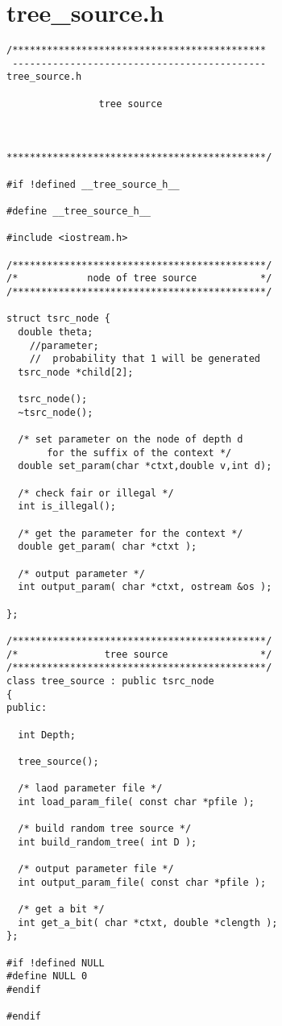 \section{tree\_source.h}
\begin{verbatim}
/********************************************
 --------------------------------------------
tree_source.h

                tree source



*********************************************/

#if !defined __tree_source_h__

#define __tree_source_h__

#include <iostream.h>

/********************************************/
/*            node of tree source           */
/********************************************/

struct tsrc_node {
  double theta;
    //parameter;
    //  probability that 1 will be generated
  tsrc_node *child[2];

  tsrc_node();
  ~tsrc_node();

  /* set parameter on the node of depth d
       for the suffix of the context */
  double set_param(char *ctxt,double v,int d);

  /* check fair or illegal */
  int is_illegal();

  /* get the parameter for the context */
  double get_param( char *ctxt );

  /* output parameter */
  int output_param( char *ctxt, ostream &os );

};

/********************************************/
/*               tree source                */
/********************************************/
class tree_source : public tsrc_node
{
public:

  int Depth;

  tree_source();

  /* laod parameter file */
  int load_param_file( const char *pfile );

  /* build random tree source */
  int build_random_tree( int D );

  /* output parameter file */
  int output_param_file( const char *pfile );

  /* get a bit */
  int get_a_bit( char *ctxt, double *clength );
};

#if !defined NULL
#define NULL 0
#endif

#endif
\end{verbatim}
